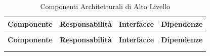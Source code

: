 \renewcommand{\arraystretch}{1.3}
\begin{xltabular}{\textwidth}{|>{\raggedright\arraybackslash\small}p{2.3cm}|p{5cm}|X|X|}
	\caption{Componenti Architetturali di Alto Livello} \label{tab:componenti-alto-livello} \\
	\hline
	\textbf{Componente} & \textbf{Responsabilità} & \textbf{Interfacce} & \textbf{Dipendenze} \\
	\hline
	\endfirsthead

	 \\
	\hline
	\textbf{Componente} & \textbf{Responsabilità} & \textbf{Interfacce} & \textbf{Dipendenze} \\
	\hline
	\endhead

	\hline
	 \\
	\hline
	\endfoot

	\hline
	\endlastfoot


\end{xltabular}

